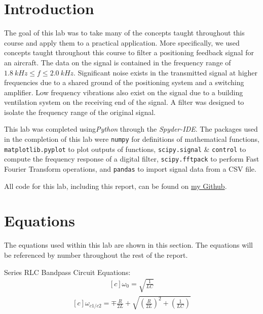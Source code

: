 \documentclass[12pt]{report}
\begin{document}
\section{Introduction}
The goal of this lab was to take many of the concepts taught throughout this course and apply them to a practical
application. More specifically, we used concepts taught throughout this course to filter a positioning feedback
signal for an aircraft. The data on the signal is contained in the frequency range of $1.8\: kHz \leq f \leq 2.0\: kHz$.
Significant noise exists in the transmitted signal at higher frequencies due to a shared ground of the positioning
system and a switching amplifier. Low frequency vibrations also exist on the signal due to a building ventilation
system on the receiving end of the signal. A filter was designed to isolate the frequency range of the original signal.

This lab was completed using\textit{Python} through the \textit{Spyder-IDE}. The packages used in the completion 
of this lab were \texttt{numpy} for definitions of mathematical functions, \texttt{matplotlib.pyplot} to plot outputs 
of functions, \texttt{scipy.signal} \& \texttt{control} to compute the frequency response of a digital filter, 
\texttt{scipy.fftpack} to perform Fast Fourier Transform operations, and \texttt{pandas} to import signal data
from a CSV file.

All code for this lab, including this report, can be found on \href{http://github.com/mac-edmondson}{my Github}.
\section{Equations}\label{section: eq}
The equations used within this lab are shown in this section. The equations will be referenced by number throughout
the rest of the report.

Series RLC Bandpass Circuit Equations:
\begin{equation}\label{eq: cen_freq} %
  \begin{aligned}[c]
    \omega_0 = \sqrt{\frac{1}{LC}}
  \end{aligned}
\end{equation}
\begin{equation}\label{eq: cen_freq} %
  \begin{aligned}[c]
    \omega_{c1/c2} = \mp \frac{R}{2L} + \sqrt{(\frac{R}{2L})^2 + (\frac{1}{LC})}
  \end{aligned}
\end{equation}
\end{document}
